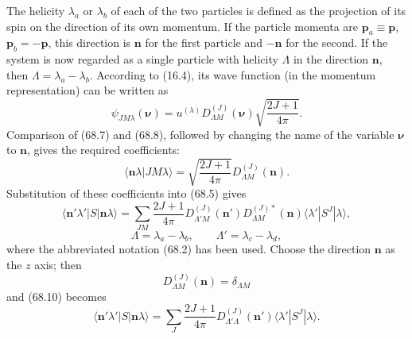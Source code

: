 The helicity $\lambda_a$ or $\lambda_b$ of each of the two particles is defined as the projection of its spin on the direction of its own momentum. If the particle momenta are $\mathbf p_a\equiv\mathbf p$, $\mathbf p_b=-\mathbf p$, this direction is $\mathbf n$ for the first particle and $-\mathbf n$ for the second. If the system is now regarded as a single particle with helicity $\Lambda$ in the direction $\mathbf n$, then $\Lambda=\lambda_a-\lambda_b$. According to (16.4), its wave function (in the momentum representation) can be written as
\begin{equation}
\psi_{JM\lambda}(\boldsymbol\nu)
=u^{(\lambda)}D_{\Lambda M}^{(J)}(\boldsymbol\nu)
\sqrt{\frac{2J+1}{4\pi}}.
\tag{68.8}
\end{equation}
Comparison of (68.7) and (68.8), followed by changing the name of the variable $\boldsymbol\nu$ to $\mathbf n$, gives the required coefficients:
\begin{equation}
\langle\mathbf n\lambda|JM\lambda\rangle
=\sqrt{\frac{2J+1}{4\pi}}D_{\Lambda M}^{(J)}(\mathbf n).
\tag{68.9}
\end{equation}
Substitution of these coefficients into (68.5) gives
\begin{equation}
\langle\mathbf n'\lambda'|S|\mathbf n\lambda\rangle
=\sum_{JM}\frac{2J+1}{4\pi}
D_{\Lambda'M}^{(J)}(\mathbf n')D_{\Lambda M}^{(J)*}(\mathbf n)
\langle\lambda'|S^J|\lambda\rangle,
\tag{68.10}
\end{equation}
\[
\Lambda=\lambda_a-\lambda_b,\qquad
\Lambda'=\lambda_c-\lambda_d,
\]
where the abbreviated notation (68.2) has been used. Choose the direction $\mathbf n$ as the $z$ axis; then
\[
D_{\Lambda M}^{(J)}(\mathbf n)=\delta_{\Lambda M}
\]
and (68.10) becomes
\begin{equation}
\langle\mathbf n'\lambda'|S|\mathbf n\lambda\rangle
=\sum_J\frac{2J+1}{4\pi}D_{\Lambda'\Lambda}^{(J)}(\mathbf n')
\langle\lambda'|S^J|\lambda\rangle.
\tag{68.11}
\end{equation}

